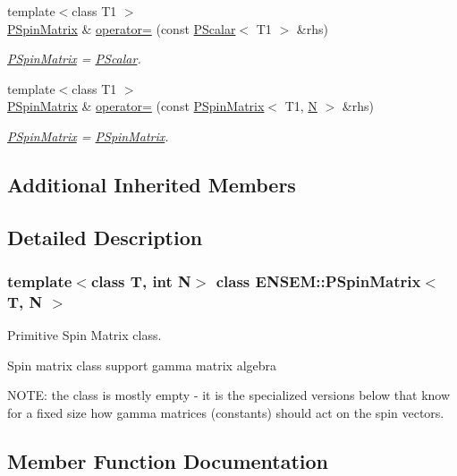 \begin{DoxyCompactItemize}
{\footnotesize template$<$class T1 $>$ }\\\mbox{\hyperlink{classENSEM_1_1PSpinMatrix}{P\+Spin\+Matrix}} \& \mbox{\hyperlink{classENSEM_1_1PSpinMatrix_a0b0ca395b4662cc2f1a18724aa8354e4}{operator=}} (const \mbox{\hyperlink{classENSEM_1_1PScalar}{P\+Scalar}}$<$ T1 $>$ \&rhs)
\begin{DoxyCompactList}\small\item\em \mbox{\hyperlink{classENSEM_1_1PSpinMatrix}{P\+Spin\+Matrix}} = \mbox{\hyperlink{classENSEM_1_1PScalar}{P\+Scalar}}. \end{DoxyCompactList}\item 
{\footnotesize template$<$class T1 $>$ }\\\mbox{\hyperlink{classENSEM_1_1PSpinMatrix}{P\+Spin\+Matrix}} \& \mbox{\hyperlink{classENSEM_1_1PSpinMatrix_a0346425dd32cab35d2f76c9d5cca8533}{operator=}} (const \mbox{\hyperlink{classENSEM_1_1PSpinMatrix}{P\+Spin\+Matrix}}$<$ T1, \mbox{\hyperlink{operator__name__util_8cc_a7722c8ecbb62d99aee7ce68b1752f337}{N}} $>$ \&rhs)
\begin{DoxyCompactList}\small\item\em \mbox{\hyperlink{classENSEM_1_1PSpinMatrix}{P\+Spin\+Matrix}} = \mbox{\hyperlink{classENSEM_1_1PSpinMatrix}{P\+Spin\+Matrix}}. \end{DoxyCompactList}\end{DoxyCompactItemize}
\subsection*{Additional Inherited Members}


\subsection{Detailed Description}
\subsubsection*{template$<$class T, int N$>$\newline
class E\+N\+S\+E\+M\+::\+P\+Spin\+Matrix$<$ T, N $>$}

Primitive Spin Matrix class. 

Spin matrix class support gamma matrix algebra

N\+O\+TE\+: the class is mostly empty -\/ it is the specialized versions below that know for a fixed size how gamma matrices (constants) should act on the spin vectors. 

\subsection{Member Function Documentation}
\mbox{\label{classENSEM_1_1PSpinMatrix_a2a776d9189f8d6fa8f9d9bc6758713c9}} 
